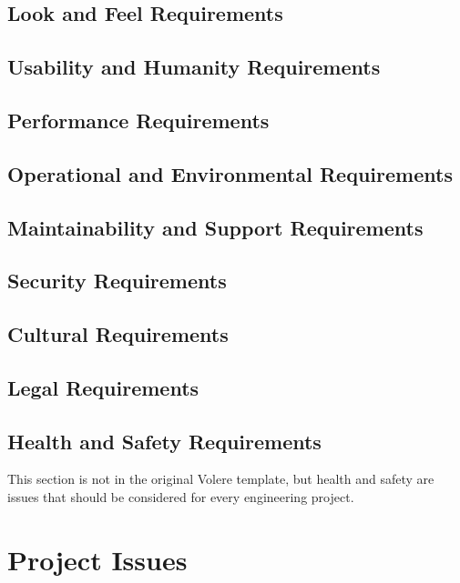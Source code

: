 \documentclass[12pt, titlepage]{article}
\begin{document}
\subsection{Look and Feel Requirements}

\subsection{Usability and Humanity Requirements}

\subsection{Performance Requirements}

\subsection{Operational and Environmental Requirements}

\subsection{Maintainability and Support Requirements}

\subsection{Security Requirements}

\subsection{Cultural Requirements}

\subsection{Legal Requirements}

\subsection{Health and Safety Requirements}

This section is not in the original Volere template, but health and safety are
issues that should be considered for every engineering project.

\section{Project Issues}
\end{document}
